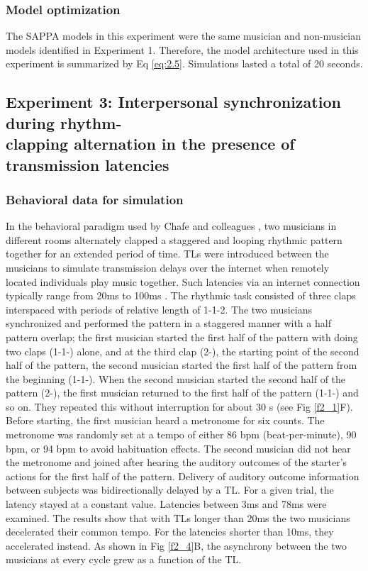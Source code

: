 \documentclass{report}
\begin{document}
\subsubsection{Model optimization}

The SAPPA models in this experiment were the same musician and non-musician models identified in Experiment 1. Therefore, the model architecture used in this experiment is summarized by Eq \eqref{eq:2.5}. Simulations lasted a total of 20 seconds.

\subsection{Experiment 3: Interpersonal synchronization during rhythm-\\ clapping alternation in the presence of transmission latencies}

\subsubsection{Behavioral data for simulation}

In the behavioral paradigm used by Chafe and colleagues \cite{chafe2010effect}, two musicians in different rooms alternately clapped a staggered and looping rhythmic pattern together for an extended period of time. TLs were introduced between the musicians to simulate transmission delays over the internet when remotely located individuals play music together. Such latencies via an internet connection typically range from 20ms to 100ms \cite{caceres2010jacktrip, caceres2008edge}. The rhythmic task consisted of three claps interspaced with periods of relative length of 1-1-2. The two musicians synchronized and performed the pattern in a staggered manner with a half pattern overlap; the first musician started the first half of the pattern with doing two claps (1-1-) alone, and at the third clap (2-), the starting point of the second half of the pattern, the second musician started the first half of the pattern from the beginning (1-1-). When the second musician started the second half of the pattern (2-), the first musician returned to the first half of the pattern (1-1-) and so on. They repeated this without interruption for about 30 s (see Fig \ref{f2_1}F). Before starting, the first musician heard a metronome for six counts. The metronome was randomly set at a tempo of either 86 bpm (beat-per-minute), 90 bpm, or 94 bpm to avoid habituation effects. The second musician did not hear the metronome and joined after hearing the auditory outcomes of the starter’s actions for the first half of the pattern. Delivery of auditory outcome information between subjects was bidirectionally delayed by a TL. For a given trial, the latency stayed at a constant value. Latencies between 3ms and 78ms were examined. The results show that with TLs longer than 20ms the two musicians decelerated their common tempo. For the latencies shorter than 10ms, they accelerated instead. As shown in Fig \ref{f2_4}B, the asynchrony between the two musicians at every cycle grew as a function of the TL.
\end{document}
